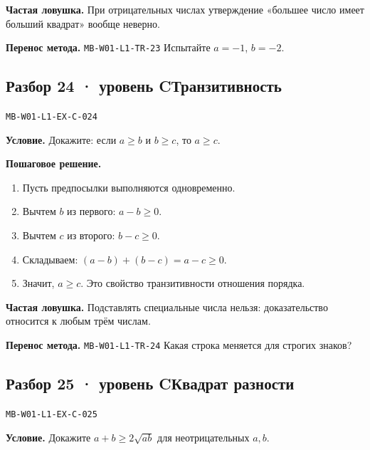 \documentclass[11pt,a4paper,openany]{book}
\newcommand{\mtag}[1]{\textsf{\small\color{mbaccent}\bfseries #1}}
\newcommand{\muid}[1]{\texttt{\footnotesize #1}}
\begin{document}
\begin{learnbox}\textbf{Частая ловушка.} При отрицательных числах утверждение «большее число имеет больший квадрат» вообще неверно.\par \textbf{Перенос метода.} \muid{MB-W01-L1-TR-23} Испытайте $a=-1$, $b=-2$.\end{learnbox}

\subsection*{\mtag{Разбор 24 · уровень C}\quad Транзитивность}\hypertarget{MB-W01-L1-EX-C-024}{}

\muid{MB-W01-L1-EX-C-024}\par

\begin{keybox}\textbf{Условие.} Докажите: если $a\ge b$ и $b\ge c$, то $a\ge c$.\end{keybox}

\textbf{Пошаговое решение.}\par
\begin{enumerate}[label=\arabic*),leftmargin=*,itemsep=3pt,topsep=4pt]
\item Пусть предпосылки выполняются одновременно.
\item Вычтем $b$ из первого: $a-b\ge0$.
\item Вычтем $c$ из второго: $b-c\ge0$.
\item Складываем: $(a-b)+(b-c)=a-c\ge0$.
\item Значит, $a\ge c$. Это свойство транзитивности отношения порядка.
\end{enumerate}


\begin{learnbox}\textbf{Частая ловушка.} Подставлять специальные числа нельзя: доказательство относится к любым трём числам.\par \textbf{Перенос метода.} \muid{MB-W01-L1-TR-24} Какая строка меняется для строгих знаков?\end{learnbox}

\subsection*{\mtag{Разбор 25 · уровень C}\quad Квадрат разности}\hypertarget{MB-W01-L1-EX-C-025}{}

\muid{MB-W01-L1-EX-C-025}\par

\begin{keybox}\textbf{Условие.} Докажите $a+b\ge2\sqrt{ab}$ для неотрицательных $a,b$.\end{keybox}
\end{document}
